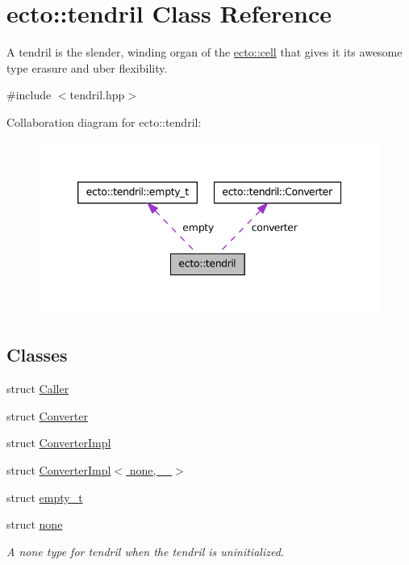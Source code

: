 \hypertarget{classecto_1_1tendril}{\section{ecto\-:\-:tendril \-Class \-Reference}
\label{classecto_1_1tendril}
}


\-A tendril is the slender, winding organ of the \hyperlink{structecto_1_1cell}{ecto\-::cell} that gives it its awesome type erasure and uber flexibility.  




{\ttfamily \#include $<$tendril.\-hpp$>$}



\-Collaboration diagram for ecto\-:\-:tendril\-:\nopagebreak
\begin{figure}[H]
\begin{center}
\leavevmode
\includegraphics[width=342pt]{classecto_1_1tendril__coll__graph}
\end{center}
\end{figure}
\subsection*{\-Classes}
\begin{DoxyCompactItemize}
\item 
struct \hyperlink{structecto_1_1tendril_1_1Caller}{\-Caller}
\item 
struct \hyperlink{structecto_1_1tendril_1_1Converter}{\-Converter}
\item 
struct \hyperlink{structecto_1_1tendril_1_1ConverterImpl}{\-Converter\-Impl}
\item 
struct \hyperlink{structecto_1_1tendril_1_1ConverterImpl_3_01none_00_01___01_4}{\-Converter\-Impl$<$ none, \-\_\- $>$}
\item 
struct \hyperlink{structecto_1_1tendril_1_1empty__t}{empty\-\_\-t}
\item 
struct \hyperlink{structecto_1_1tendril_1_1none}{none}
\begin{DoxyCompactList}\small\item\em \-A none type for tendril when the tendril is uninitialized. \end{DoxyCompactList}\end{DoxyCompactItemize}
